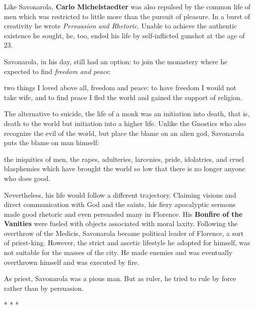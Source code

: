 Like Savonarola, \textbf{Carlo Michelstaedter} was also repulsed by the common life of men which was restricted to little more than the pursuit of pleasure. In a burst of creativity he wrote \emph{Persuasion and Rhetoric}. Unable to achieve the authentic existence he sought, he, too, ended his life by self-inflicted gunshot at the age of 23.

{}


Savonarola, in his day, still had an option: to join the monastery where he expected to find \emph{freedom and peace}:

\begin{quotex}
two things I loved above all, freedom and peace: to have freedom I would not take wife, and to find peace I fled the world and gained the support of religion.
\end{quotex}


The alternative to suicide, the life of a monk was an initiation into death, that is, death to the world but initiation into a higher life. Unlike the Gnostics who also recognize the evil of the world, but place the blame on an alien god, Savonarola puts the blame on man himself:

\begin{quotex}
the iniquities of men, the rapes, adulteries, larcenies, pride, idolatries, and cruel blasphemies which have brought the world so low that there is no longer anyone who does good.
\end{quotex}


Nevertheless, his life would follow a different trajectory. Claiming visions and direct communication with God and the saints, his fiery apocalyptic sermons made good rhetoric and even persuaded many in Florence. His \textbf{Bonfire of the Vanities} were fueled with objects associated with moral laxity. Following the overthrow of the Medicis, Savonarola became political leader of Florence, a sort of priest-king. However, the strict and ascetic lifestyle he adopted for himself, was not suitable for the masses of the city. He made enemies and was eventually overthrown himself and was executed by fire.

As priest, Savonarola was a pious man. But as ruler, he tried to rule by force rather than by persuasion.



\begin{center}* * *\end{center}

